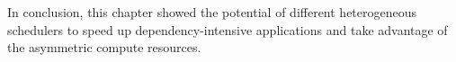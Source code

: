 
In conclusion, this chapter showed the potential of different heterogeneous schedulers to speed up dependency-intensive applications and take advantage of the asymmetric compute resources.



